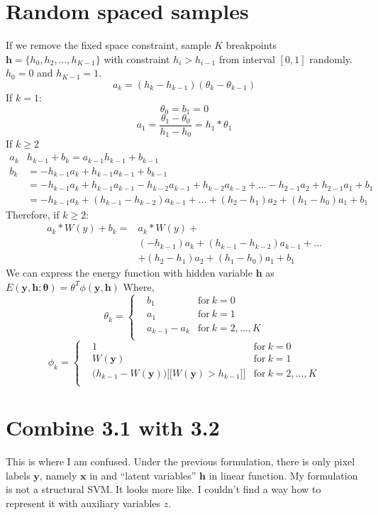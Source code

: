 \documentclass{article}
\begin{document}
	\section{Random spaced samples}
	If we remove the fixed space constraint, sample $K$ breakpoints $\mathbf{h}=\{h_0,h_2,\dots,h_{K-1}\}$ with constraint $h_i>h_{i-1}$ from interval $[0,1]$ randomly. $h_0=0$ and $h_{K-1}=1$.\\
	$$a_k=(h_k-h_{k-1})(\theta_k-\theta_{k-1})$$
	If $k =1$:
	$$
	\theta_0=b_1 = 0
	$$
	$$
	a_1 =\frac{\theta_1-\theta_0}{h_1-h_0}= h_1*\theta_1
	$$
	If $k \geq 2$
	\begin{align*}
	a_k&h_{k-1}+b_k = a_{k-1}h_{k-1}+b_{k-1}\\
	b_k&= -h_{k-1}a_k+h_{k-1}a_{k-1}+b_{k-1}\\
	&=-h_{k-1}a_k+h_{k-1}a_{k-1}-h_{k-2}a_{k-1}+h_{k-2}a_{k-2}+\dots-h_{2-1}a_2+h_{2-1}a_1+b_1\\
	&=-h_{k-1}a_k+(h_{k-1}-h_{k-2})a_{k-1}+\dots+(h_2-h_1)a_2+(h_1-h_0)a_1+b_1
	\end{align*}
	Therefore, if $k \geq 2$:
	\begin{align*}
	a_k*W(y)+b_k=&a_k*W(y)+\\
	&(-h_{k-1})a_k+(h_{k-1}-h_{k-2})a_{k-1}+\dots\\
	&+(h_2-h_1)a_2+(h_1-h_0)a_1+b_1
	\end{align*}
	We can express the energy function with hidden variable $\mathbf{h}$ as $E(\mathbf{y},\mathbf{h};\mathbf{\theta})=\mathbb{\theta}^T\phi(\mathbf{y},\mathbf{h})$
	Where,
	\begin{equation*}
	\theta_k = \left\{
	\begin{aligned}
	& b_1	& \text{for} \ k=0\\
	& a_1 & \text{for}\ k=1\\
	& a_{k-1}-a_k  & \text{for} \ k=2,\dots,K\\
	\end{aligned}
	\right.
	\end{equation*}
	\begin{equation*}
	\phi_k = \left\{
	\begin{aligned}
	& 1	& \text{for} \ k=0\\
	& W(\mathbf{y}) & \text{for}\ k=1\\
	& \bigg(h_{k-1}-W(\mathbf{y}) \bigg)\bigg[\bigg[ W(\mathbf{y}) > h_{k-1}\bigg]\bigg]  & \text{for} \ k=2,\dots,K\\
	\end{aligned}
	\right.
	\end{equation*}
	
	\section{Combine 3.1 with 3.2}
	This is where I am confused. 
	Under the previous formulation, there is only pixel labels $\mathbf{y}$, namely $\mathbf{x}$ in \cite{yu2009learning} and ``latent variables'' $\mathbf{h}$ in linear function. My formulation is not a structural SVM. It 
	looks more like\cite{felzenszwalb2010object}. I couldn't find a way how to represent it with auxiliary variables $z$.
	
	
	\renewcommand\refname{Bibliography}
	
	
\end{document}
